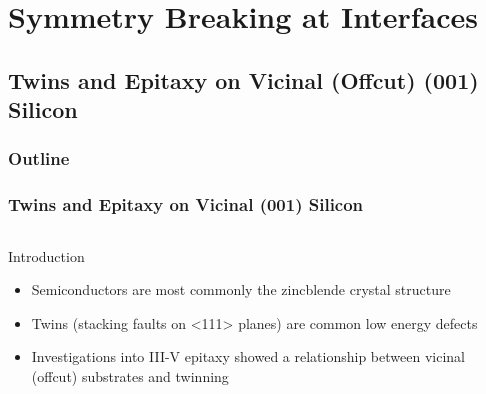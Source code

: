 \documentclass[]{beamer}%
\begin{document}
\section{Symmetry Breaking at Interfaces}
\subsection{Twins and Epitaxy on Vicinal (Offcut) (001) Silicon}
\begin{frame}
\frametitle{Outline}
\end{frame}

\begin{frame}
    \frametitle{Twins and Epitaxy on Vicinal (001) Silicon}
    \begin{columns}
        \begin{column}{0.5\textwidth}
            \begin{block}{Introduction}
                \begin{itemize}[<+-| alert@+>]
                    \item Semiconductors are most commonly the zincblende crystal structure
                    \item Twins (stacking faults on <111> planes) are common low energy defects
                    \item Investigations into III-V epitaxy showed a relationship between vicinal (offcut) substrates and twinning
                \end{itemize}
            \end{block}
        \end{column}
        \begin{column}{0.5\textwidth}
            \centering
             \\

\end{column}
\end{columns}
\end{frame}
\end{document}
